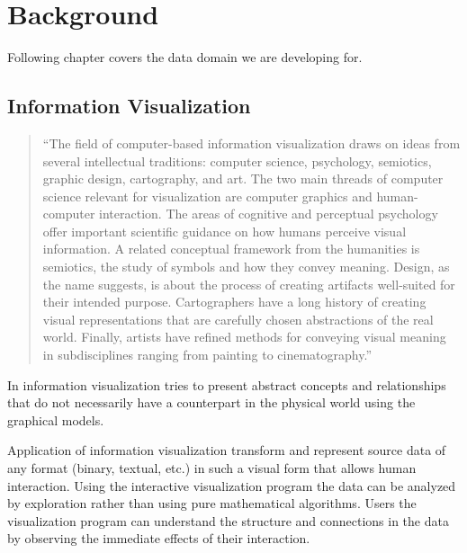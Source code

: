 \newpage
\section{Background}

Following chapter covers the data domain we are developing for.

\label{sec:background}


\subsection{Information Visualization}
\label{sec:infovis}

\begin{quotation}
``The field of computer-based information visualization draws on ideas from several intellectual traditions:
computer science, psychology, semiotics, graphic design, cartography, and art.
The two main threads of computer science relevant for visualization are computer graphics and human-computer interaction.
The areas of cognitive and perceptual psychology offer important scientific guidance on how humans perceive visual information.
A related conceptual framework from the humanities is semiotics, the study of symbols and how they convey meaning.
Design, as the name suggests, is about the process of creating artifacts well-suited for their intended purpose.
Cartographers have a long history of creating visual representations that are carefully chosen abstractions of the real world.
Finally, artists have refined methods for conveying visual meaning in subdisciplines ranging from painting to cinematography.''~\cite{InfoVis}
\end{quotation}

In information visualization tries to present abstract concepts and relationships that do not necessarily have a counterpart in the physical world using the graphical models. 

Application of information visualization transform and represent source data of any format (binary, textual, etc.) in such a visual form that allows human interaction. Using the interactive visualization program the data can be analyzed by exploration rather than using pure mathematical algorithms. Users the visualization program can understand the structure and connections in the data by observing the immediate effects of their interaction. 

